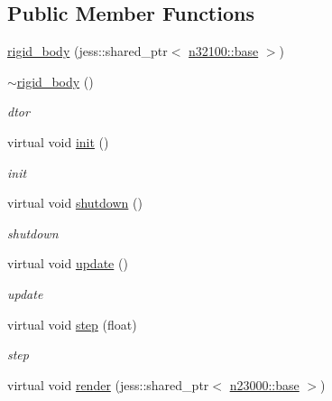 \subsection*{Public Member Functions}
\begin{DoxyCompactItemize}
\item 
\hyperlink{classnebula_1_1content_1_1actor_1_1admin_1_1rigid__body_ab6e6cfc09165df01672f18bff95af841}{rigid\_\-body} (jess::shared\_\-ptr$<$ \hyperlink{classnebula_1_1content_1_1scene_1_1admin_1_1base}{n32100::base} $>$)
\item 
\hyperlink{classnebula_1_1content_1_1actor_1_1admin_1_1rigid__body_a77aa0eaf0c39bf149e49c5651806807d}{$\sim$rigid\_\-body} ()
\begin{DoxyCompactList}\small\item\em dtor \item\end{DoxyCompactList}\item 
virtual void \hyperlink{classnebula_1_1content_1_1actor_1_1admin_1_1rigid__body_a549b82effcb63341aa4057712446ce22}{init} ()
\begin{DoxyCompactList}\small\item\em init \item\end{DoxyCompactList}\item 
virtual void \hyperlink{classnebula_1_1content_1_1actor_1_1admin_1_1rigid__body_ab0ed9e145b42efdd0049e2e1ef7d5da4}{shutdown} ()
\begin{DoxyCompactList}\small\item\em shutdown \item\end{DoxyCompactList}\item 
virtual void \hyperlink{classnebula_1_1content_1_1actor_1_1admin_1_1rigid__body_aacabe8d617dd48c2ffec43edae75553d}{update} ()
\begin{DoxyCompactList}\small\item\em update \item\end{DoxyCompactList}\item 
virtual void \hyperlink{classnebula_1_1content_1_1actor_1_1admin_1_1rigid__body_a91d4e1a3e78ee41a5ddea1974a88045d}{step} (float)
\begin{DoxyCompactList}\small\item\em step \item\end{DoxyCompactList}\item 
virtual void \hyperlink{classnebula_1_1content_1_1actor_1_1admin_1_1rigid__body_a88b9c26608737c7850b4eef227548a59}{render} (jess::shared\_\-ptr$<$ \hyperlink{classnebula_1_1platform_1_1renderer_1_1base}{n23000::base} $>$)

\end{DoxyCompactItemize}
